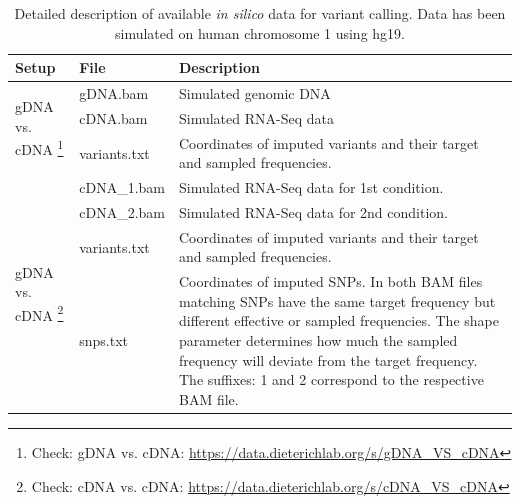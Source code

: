 \documentclass[10pt,a4paper,final]{article}
\begin{document}
\newcommand{\callRDD}{Check: gDNA vs. cDNA: \url{https://data.dieterichlab.org/s/gDNA_VS_cDNA}}
\newcommand{\callRRD}{Check: cDNA vs. cDNA: \url{https://data.dieterichlab.org/s/cDNA_VS_cDNA}}
\begin{table}
  \centering
  \caption{Detailed description of available \textit{in silico} data for variant calling. Data has been simulated on human chromosome 1 using hg19.}
  \label{tbl:call_data}
  {\small
  \begin{tabular}{llp{}}
    \textbf{Setup} & \textbf{File} & \textbf{Description} \\
    \hline
    \hline
    \multirow{3}{*}{gDNA vs. cDNA \footnote{\callRDD}} & gDNA.bam     & Simulated genomic DNA \\
                                                       & cDNA.bam     & Simulated RNA-Seq data \\
                                                       & variants.txt & Coordinates of imputed variants and their target 
                                                                        and sampled frequencies. \\
    \hline
    \multirow{4}{*}{gDNA vs. cDNA \footnote{\callRRD}} & cDNA\_1.bam  & Simulated RNA-Seq data for 1st condition. \\
                                                       & cDNA\_2.bam  & Simulated RNA-Seq data for 2nd condition. \\
                                                       & variants.txt & Coordinates of imputed variants and their target 
                                                                        and sampled frequencies. \\
                                                       & snps.txt     & Coordinates of imputed SNPs. In both BAM files 
                                                                        matching SNPs have the same target frequency but 
                                                                        different effective or sampled frequencies. The 
                                                                        shape parameter determines how much the sampled 
                                                                        frequency will deviate from the target frequency. 
                                                                        The suffixes: 1 and 2 correspond 
                                                                        to the respective BAM file.
  \end{tabular}}
\end{table}
\end{document}

